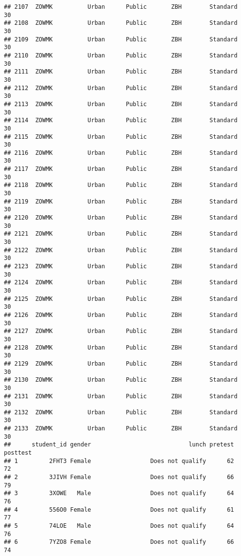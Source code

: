 \documentclass[
]{article}
\begin{document}
\begin{verbatim}
## 2107  ZOWMK          Urban      Public       ZBH        Standard        30
## 2108  ZOWMK          Urban      Public       ZBH        Standard        30
## 2109  ZOWMK          Urban      Public       ZBH        Standard        30
## 2110  ZOWMK          Urban      Public       ZBH        Standard        30
## 2111  ZOWMK          Urban      Public       ZBH        Standard        30
## 2112  ZOWMK          Urban      Public       ZBH        Standard        30
## 2113  ZOWMK          Urban      Public       ZBH        Standard        30
## 2114  ZOWMK          Urban      Public       ZBH        Standard        30
## 2115  ZOWMK          Urban      Public       ZBH        Standard        30
## 2116  ZOWMK          Urban      Public       ZBH        Standard        30
## 2117  ZOWMK          Urban      Public       ZBH        Standard        30
## 2118  ZOWMK          Urban      Public       ZBH        Standard        30
## 2119  ZOWMK          Urban      Public       ZBH        Standard        30
## 2120  ZOWMK          Urban      Public       ZBH        Standard        30
## 2121  ZOWMK          Urban      Public       ZBH        Standard        30
## 2122  ZOWMK          Urban      Public       ZBH        Standard        30
## 2123  ZOWMK          Urban      Public       ZBH        Standard        30
## 2124  ZOWMK          Urban      Public       ZBH        Standard        30
## 2125  ZOWMK          Urban      Public       ZBH        Standard        30
## 2126  ZOWMK          Urban      Public       ZBH        Standard        30
## 2127  ZOWMK          Urban      Public       ZBH        Standard        30
## 2128  ZOWMK          Urban      Public       ZBH        Standard        30
## 2129  ZOWMK          Urban      Public       ZBH        Standard        30
## 2130  ZOWMK          Urban      Public       ZBH        Standard        30
## 2131  ZOWMK          Urban      Public       ZBH        Standard        30
## 2132  ZOWMK          Urban      Public       ZBH        Standard        30
## 2133  ZOWMK          Urban      Public       ZBH        Standard        30
##      student_id gender                            lunch pretest posttest
## 1         2FHT3 Female                 Does not qualify      62       72
## 2         3JIVH Female                 Does not qualify      66       79
## 3         3XOWE   Male                 Does not qualify      64       76
## 4         556O0 Female                 Does not qualify      61       77
## 5         74LOE   Male                 Does not qualify      64       76
## 6         7YZO8 Female                 Does not qualify      66       74

\end{verbatim}
\end{document}
